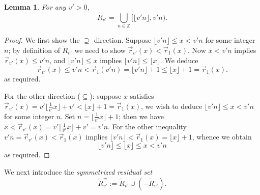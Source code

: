 \documentclass[12pt,letterpaper, reqno]{amsart}
\newtheorem{lem}[thm]{Lemma}
\theoremstyle{definition}
\theoremstyle{remark}
\newcommand{\ZZ}{\ensuremath{\mathbb{Z}}}
\newcommand{\vv}{{v'}}
\newcommand{\R}{{R}}
\newcommand{\floor}[1]{\lfloor{#1}\rfloor}
\newcommand{\ceil}[1]{\lceil{#1}\rceil}
\newcommand{\tround}{\vec{r}}
\begin{document}
\begin{lem}\label{lem:51}
 For any $\vv>0$,
\[ 
 \widetilde{\R}_\vv = \bigcup_{n\in\ZZ} \big[\textstyle \floor{{\vv} n}, \vv n \big).
\]
\end{lem}

\begin{proof}
We first show the $\supseteq$ direction. Suppose $\floor{{\vv}n}\leq x< \vv n$ for some integer $n$; 
by definition of $\widetilde{\R}_\vv$ we need to show $\vec{r}_{\vv}(x) < \vec{r}_{1}(x)$.
Now $x < \vv n$ implies $\vec{r}_{\vv}(x) \le \vv n$, and $\floor{{\vv} n} \leq x$ 
implies $\floor{{\vv} n} \leq \floor{ x}$. We deduce
\[ 
\vec{r}_{\vv}(x) \le \vv n < \tround_1(\vv n) =\floor{{\vv} n} +{1}\leq \floor{x} +{1} = \tround_1(x) .
\]
as required.

For the other direction ($\subseteq$): suppose $x$ satisfies $\tround_\vv(x) = {\vv}\floor{\frac{1}\vv x}+{\vv}<\floor{ x}+{1} = \tround_1(x)$,  we wish to deduce
$\floor{{\vv}n}\leq x< \vv n$ for some integer $n$.
Set $n = \floor{\frac1{\vv}x}+1$; then we have 
$  x<\tround_\vv(x)=\vv\floor{\frac1\vv x} + \vv = \vv n.$
For the other inequality  
${\vv}n  = \tround_\vv(x) < \tround_1(x) $
implies 
$\floor{{\vv} n} < \tround_1(x) = \floor{x}+1$, whence we obtain 
 $$ \floor{{\vv} n} \leq  \floor{x} \leq x < \vv n$$
as required.
\end{proof}

We next introduce the {\em symmetrized residual set}
\[ 
\widetilde{\R}^\pm_\vv := \widetilde{\R}_\vv\cup (-\widetilde{\R}_\vv).
\]
\end{document}
